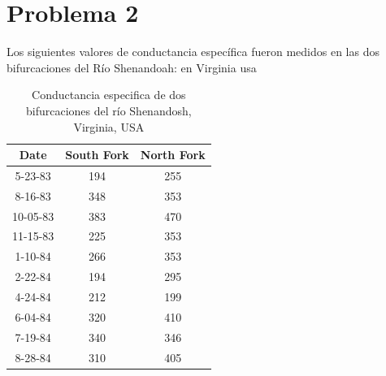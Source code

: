 \documentclass[a4paper,12pt]{article} %
\begin{document}
\section*{Problema 2}
Los siguientes valores de conductancia específica fueron medidos en las dos bifurcaciones del Río Shenandoah: en Virginia usa
\begin{center}
	\begin{table}[H]
		\centering
		\begin{tabular}{|c|c|c|} \hline
			\textbf{Date}&\textbf{South Fork}&\textbf{North Fork}\\ \hline
			5-23-83&194&255\\
			8-16-83&348&353\\
			10-05-83&383&470\\
			11-15-83&225&353\\
			1-10-84&266&353\\
			2-22-84&194&295\\
			4-24-84&212&199\\
			6-04-84&320&410\\
			7-19-84&340&346\\
			8-28-84&310&405\\ \hline
			\end{tabular}
			\caption{Conductancia especifica de dos bifurcaciones del río Shenandosh, Virginia, USA}
			\label{tab:my_label2}
		\end{table}
	\end{center}
\end{document}
